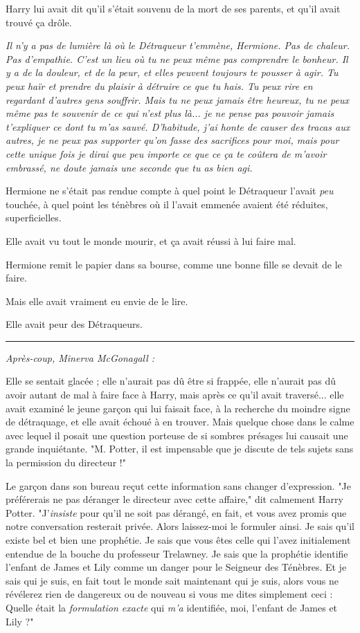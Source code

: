 Harry lui avait dit qu'il s'était souvenu de la mort de ses parents, et qu'il avait trouvé ça drôle.

\emph{Il n'y a pas de lumière là où le Détraqueur t'emmène, Hermione. Pas de chaleur. Pas d'empathie. C'est un lieu où tu ne peux même pas comprendre le bonheur. Il y a de la douleur, et de la peur, et elles peuvent toujours te pousser à agir. Tu peux haïr et prendre du plaisir à détruire ce que tu hais. Tu peux rire en regardant d'autres gens souffrir. Mais tu ne peux jamais être heureux, tu ne peux même pas te souvenir de ce qui n'est plus là... je ne pense pas pouvoir jamais t'expliquer ce dont tu m'as sauvé. D'habitude, j'ai honte de causer des tracas aux autres, je ne peux pas supporter qu'on fasse des sacrifices pour moi, mais pour cette unique fois je dirai que peu importe ce que ce ça te coûtera de m'avoir embrassé, ne doute jamais une seconde que tu as bien agi.} 

Hermione ne s'était pas rendue compte à quel point le Détraqueur l'avait \emph{peu}  touchée, à quel point les ténèbres où il l'avait emmenée avaient été réduites, superficielles.

Elle avait vu tout le monde mourir, et ça avait réussi à lui faire mal.

Hermione remit le papier dans sa bourse, comme une bonne fille se devait de le faire.

Mais elle avait vraiment eu envie de le lire.

Elle avait peur des Détraqueurs.
\par\noindent\rule{\textwidth}{0.4pt}
\emph{Après-coup, Minerva McGonagall :} 

Elle se sentait glacée ; elle n'aurait pas dû être si frappée, elle n'aurait pas dû avoir autant de mal à faire face à Harry, mais après ce qu'il avait traversé... elle avait examiné le jeune garçon qui lui faisait face, à la recherche du moindre signe de détraquage, et elle avait échoué à en trouver. Mais quelque chose dans le calme avec lequel il posait une question porteuse de si sombres présages lui causait une grande inquiétante. "M. Potter, il est impensable que je discute de tels sujets sans la permission du directeur !"

Le garçon dans son bureau reçut cette information sans changer d'expression. "Je préférerais ne pas déranger le directeur avec cette affaire," dit calmement Harry Potter. "J'\emph{insiste}  pour qu'il ne soit pas dérangé, en fait, et vous avez promis que notre conversation resterait privée. Alors laissez-moi le formuler ainsi. Je sais qu'il existe bel et bien une prophétie. Je sais que vous êtes celle qui l'avez initialement entendue de la bouche du professeur Trelawney. Je sais que la prophétie identifie l'enfant de James et Lily comme un danger pour le Seigneur des Ténèbres. Et je sais qui je suis, en fait tout le monde sait maintenant qui je suis, alors vous ne révélerez rien de dangereux ou de nouveau si vous me dites simplement ceci : Quelle était la \emph{formulation exacte}  qui \emph{m'a}  identifiée, moi, l'enfant de James et Lily ?"

